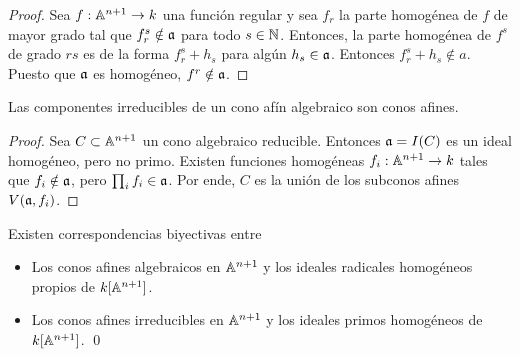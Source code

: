 \begin{proof}
Sea $f : \mathbb A^{n+1} \to k$ una función regular y sea $f_r$ la parte homogénea de $f$ de mayor grado tal que $f_r^s \notin \mathfrak a$ para todo $s \in \mathbb N$. Entonces, la parte homogénea de $f^s$ de grado $rs$ es de la forma $f_r^s + h_s$ para algún $h_s \in \mathfrak a$. Entonces $f_r^s + h_s \notin a$. Puesto que $\mathfrak a$ es homogéneo, $f^r \notin \mathfrak a$.
\end{proof}

\begin{proposition}
Las componentes irreducibles de un cono afín algebraico son conos afines.
\end{proposition}

\begin{proof}
Sea $C \subset \mathbb A^{n+1}$ un cono algebraico reducible. Entonces $\mathfrak a = I(C)$ es un ideal homogéneo, pero no primo. Existen funciones homogéneas $f_i : \mathbb A^{n+1} \to k$ tales que $f_i \notin \mathfrak a$, pero $\prod_i f_i \in \mathfrak a$. Por ende, $C$ es la unión de los subconos afines $V(\mathfrak a, f_i)$.
\end{proof}

\begin{corollary}
Existen correspondencias biyectivas entre

\begin{itemize}
    \item Los conos afines algebraicos en $\mathbb A^{n+1}$ y los ideales radicales homogéneos propios de $k[\mathbb A^{n+1}]$.
    \item Los conos afines irreducibles en $\mathbb A^{n+1}$ y los ideales primos homogéneos de $k[\mathbb A^{n+1}]$. \qed
\end{itemize}
\end{corollary}
